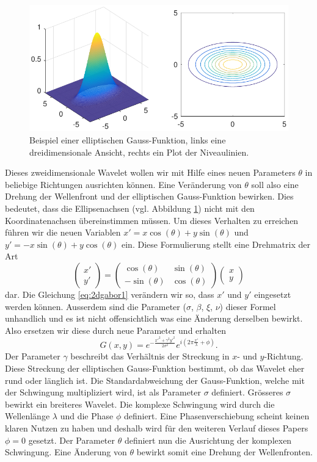 \begin{figure}
	\centering
	\includegraphics[width=0.7\linewidth]{./papers/visuell/images/2d_gauss.pdf}
	\caption{Beispiel einer elliptischen Gauss-Funktion, links eine dreidimensionale Ansicht, rechts ein Plot der Niveaulinien.}
	\label{fig:2d_gauss}
\end{figure}

Dieses zweidimensionale Wavelet wollen wir mit Hilfe eines neuen Parameters $\theta$ in beliebige Richtungen ausrichten können.
Eine Veränderung von $\theta$ soll also eine Drehung der Wellenfront und der elliptischen Gauss-Funktion bewirken.
Dies bedeutet, dass die Ellipsenachsen (vgl. Abbildung \ref{fig:2d_gauss}) nicht mit den Koordinatenachsen übereinstimmen müssen. 
Um dieses Verhalten zu erreichen führen wir die neuen Variablen $x'=x\cos(\theta)+y\sin(\theta)$ und $y'=-x\sin(\theta)+y\cos(\theta)$ ein.
Diese Formulierung stellt eine Drehmatrix der Art
%
\begin{equation}
\begin{pmatrix}
x' \\
y'
\end{pmatrix}
=
\begin{pmatrix}
\cos(\theta) & \sin(\theta) \\
-\sin(\theta) & \cos(\theta)
\end{pmatrix}
\begin{pmatrix}
x \\
y
\end{pmatrix}
\end{equation}
dar.
Die Gleichung \ref{eq:2dgabor1} verändern wir so, dass $x'$ und $y'$ eingesetzt werden können.
Ausserdem sind die Parameter ($\sigma$, $\beta$, $\xi$, $\nu$) dieser Formel unhandlich und es ist nicht offensichtlich was eine Änderung derselben bewirkt.
Also ersetzen wir diese durch neue Parameter und erhalten 
\begin{equation}
G(x,y)=e^{-\frac{x'^{2}+\gamma^{2}y'^{2}}{2\sigma^{2}}}
e^{i(2\pi\frac{x'}{\lambda} + \phi)}.
\end{equation} 
Der Parameter $\gamma$ beschreibt das Verhältnis der Streckung in $x$- und $y$-Richtung.
Diese Streckung der elliptischen Gauss-Funktion bestimmt, ob das Wavelet eher rund oder länglich ist.
Die Standardabweichung der Gauss-Funktion, welche mit der Schwingung multipliziert wird, ist als Parameter $\sigma$ definiert.
Grösseres $\sigma$ bewirkt ein breiteres Wavelet.
Die komplexe Schwingung wird durch die Wellenlänge $\lambda$ und die Phase $\phi$ definiert.
Eine Phasenverschiebung scheint keinen klaren Nutzen zu haben und deshalb  wird für den weiteren Verlauf dieses Papers $\phi=0$ gesetzt.
Der Parameter $\theta$ definiert nun die Ausrichtung der komplexen Schwingung.
Eine Änderung von $\theta$  bewirkt somit eine Drehung der Wellenfronten.

